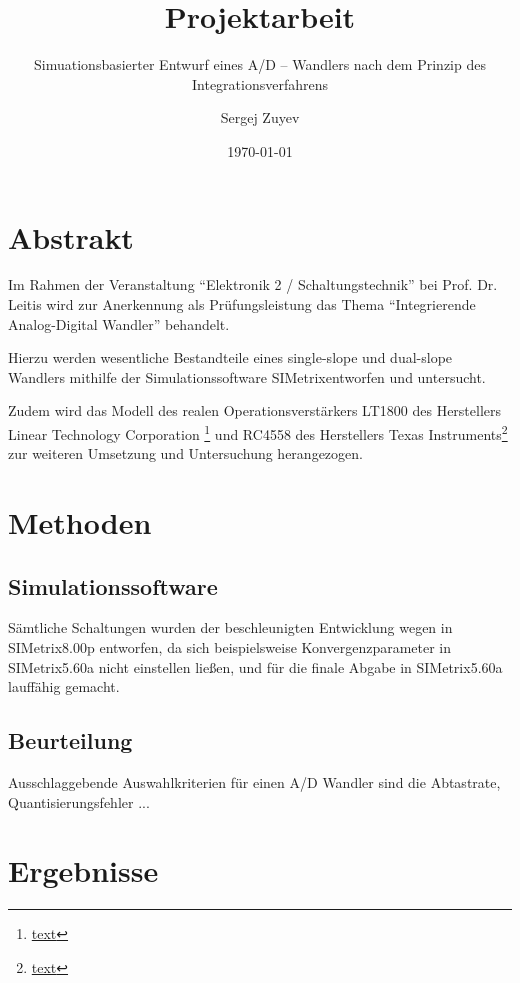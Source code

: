 \documentclass[
	ngerman,
	parskip=half,
	headsepline,
	fontsize=12pt,
	DIV=13,
	listof=leveldown,
	]{scrreprt}
\author{Sergej Zuyev}
\title{Projektarbeit}
\subtitle{Simuationsbasierter Entwurf eines A/D – Wandlers nach dem Prinzip des Integrationsverfahrens}
\date{\today}
\begin{document}
	
	\maketitle
		
	\tableofcontents
	\clearpage
	
		
	\twocolumn
	

	
	\chapter{Abstrakt}
	
	Im Rahmen der Veranstaltung \enquote{Elektronik 2 / Schaltungstechnik} bei Prof. Dr. Leitis wird zur Anerkennung als Prüfungsleistung das Thema \enquote{Integrierende Analog-Digital Wandler} behandelt.
	
	Hierzu werden wesentliche Bestandteile eines single-slope und dual-slope Wandlers mithilfe der Simulationssoftware SIMetrix\texttrademark entworfen und untersucht.
	
	Zudem wird das Modell des realen Operationsverstärkers LT1800 des Herstellers Linear Technology Corporation \footnote{\url{text}} und RC4558 des Herstellers Texas Instruments\footnote{\url{text}} zur weiteren Umsetzung und Untersuchung herangezogen.
	
	\chapter{Methoden}
		\section{Simulationssoftware}
		
		Sämtliche Schaltungen wurden der beschleunigten Entwicklung wegen in SIMetrix\texttrademark 8.00p entworfen, da sich beispielsweise Konvergenzparameter in SIMetrix\texttrademark 5.60a nicht einstellen ließen, und für die finale Abgabe in SIMetrix\texttrademark 5.60a lauffähig gemacht.  
		
		\section{Beurteilung}
		Ausschlaggebende Auswahlkriterien für einen A/D Wandler sind die Abtastrate, Quantisierungsfehler ...
		
	\chapter{Ergebnisse}
\end{document}
